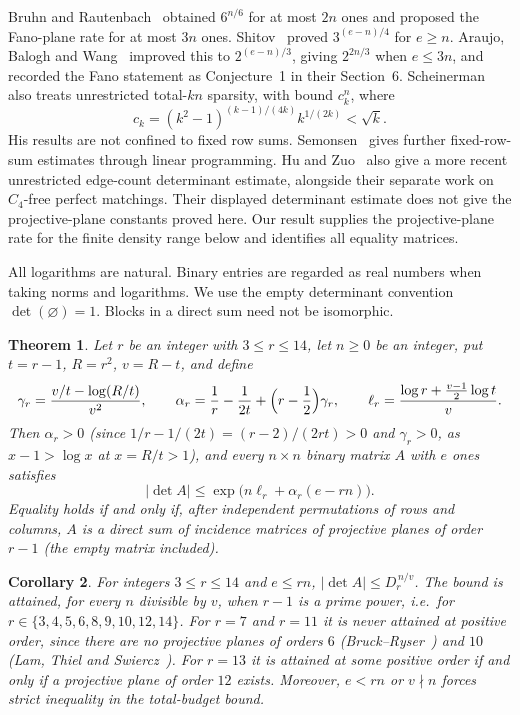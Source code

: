 \documentclass[11pt]{article}
\newtheorem{theorem}{Theorem}
\newtheorem{corollary}[theorem]{Corollary}
\theoremstyle{remark}
\begin{document}
Bruhn and Rautenbach~\cite{BR} obtained $6^{n/6}$ for at most $2n$ ones and
proposed the Fano-plane rate for at most $3n$ ones. Shitov~\cite{Sh} proved
$3^{(e-n)/4}$ for $e\ge n$. Araujo, Balogh and Wang~\cite[Theorem~3]{ABW}
improved this to $2^{(e-n)/3}$, giving $2^{2n/3}$ when $e\le3n$, and
recorded the Fano statement as Conjecture~1 in their Section~6.
Scheinerman~\cite[Theorem~7.1]{S} also treats unrestricted total-$kn$ sparsity,
with bound $c_k^n$, where
\[
 c_k=(k^2-1)^{(k-1)/(4k)}k^{1/(2k)}<\sqrt{k}.
\]
His results are not confined to fixed row sums. Semonsen~\cite{Se} gives
further fixed-row-sum estimates through linear programming.
Hu and Zuo~\cite[Theorem~4]{HZ} also give a more recent unrestricted
edge-count determinant estimate, alongside their separate work on $C_4$-free
perfect matchings. Their displayed determinant estimate does not give the
projective-plane constants proved here. Our result
supplies the projective-plane rate for the finite density range below and
identifies all equality matrices.

All logarithms are natural. Binary entries are regarded as real numbers when
taking norms and logarithms. We use the empty determinant convention
$\det(\varnothing)=1$. Blocks in a direct sum need not be isomorphic.

\begin{theorem}\label{thm:main}
Let $r$ be an integer with $3\le r\le 14$, let $n\ge0$ be an integer, put $t=r-1$, $R=r^2$, $v=R-t$, and define
\[
\gamma_r=\frac{v/t-\log(R/t)}{v^2},\qquad
\alpha_r=\frac1r-\frac1{2t}+\Bigl(r-\frac12\Bigr)\gamma_r,\qquad
\ell_r=\frac{\log r+\frac{v-1}{2}\log t}{v}.
\]
Then $\alpha_r>0$ (since $1/r-1/(2t)=(r-2)/(2rt)>0$ and $\gamma_r>0$, as $x-1>\log x$ at $x=R/t>1$), and
every $n\times n$ binary matrix $A$ with $e$ ones satisfies
\begin{equation}\label{eq:main}
|\det A|\le \exp\bigl(n\ell_r+\alpha_r(e-rn)\bigr).
\end{equation}
Equality holds if and only if, after independent permutations of rows and columns, $A$ is a direct sum of
incidence matrices of projective planes of order $r-1$ (the empty matrix included).
\end{theorem}

\begin{corollary}
For integers $3\le r\le 14$ and $e\le rn$, $|\det A|\le D_r^{\,n/v}$. The bound is attained, for every $n$ divisible by
$v$, when $r-1$ is a prime power, i.e.\ for $r\in\{3,4,5,6,8,9,10,12,14\}$. For $r=7$ and $r=11$ it is never
attained at positive order, since there are no projective planes of orders $6$ (Bruck--Ryser~\cite{BruckRyser}) and $10$ (Lam, Thiel and Swiercz~\cite{LTS}).
For $r=13$ it is attained at some positive order if and only if a projective plane of order $12$ exists.
Moreover, $e<rn$ or $v\nmid n$ forces strict inequality in the total-budget bound.
\end{corollary}
\end{document}
